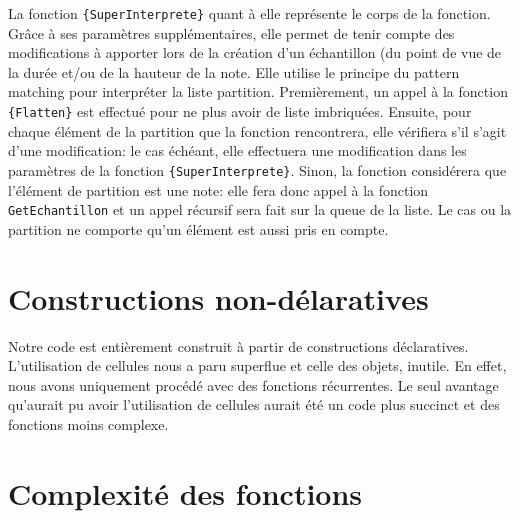 \documentclass[a4paper,12pt,oneside ]{article}
\begin{document}
	La fonction \texttt{\{SuperInterprete\}} quant à elle représente le corps de la fonction. Grâce à ses paramètres supplémentaires, elle permet de tenir compte des modifications à apporter lors de la création d'un échantillon (du point de vue de la durée et/ou de la hauteur de la note. Elle utilise le principe du pattern matching pour interpréter la liste partition. Premièrement, un appel à la fonction \texttt{\{Flatten\}} est effectué pour ne plus avoir de liste imbriquées. Ensuite, pour chaque élément de la partition que la fonction rencontrera, elle vérifiera s'il s'agit d'une modification: le cas échéant, elle effectuera une modification dans les paramètres de la fonction \texttt{\{SuperInterprete\}}. Sinon, la fonction considérera que l'élément de partition est une note: elle fera donc appel à la fonction \texttt{GetEchantillon} et un appel récursif sera fait sur la queue de la liste. Le cas ou la partition ne comporte qu'un élément est aussi pris en compte.
	
\section{Constructions non-délaratives}
Notre code est entièrement construit à partir de constructions déclaratives. L'utilisation de cellules nous a paru superflue et celle des objets, inutile. En effet, nous avons uniquement procédé avec des fonctions récurrentes. Le seul avantage qu'aurait pu avoir l'utilisation de cellules aurait été un code plus succinct et des fonctions moins complexe.

\section{Complexité des fonctions}
\end{document}
